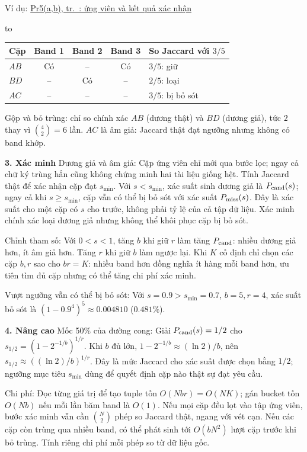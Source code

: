 \documentclass[10pt,a4paper,twocolumn]{article}
\newcommand{\key}[1]{#1:\enspace}
\newcommand{\blocklabel}[1]{\par\noindent#1\par\nobreak}
\newcommand{\qlink}[2]{\hyperref[question:#1]{#2}}
\newenvironment{example}[2]{%
  \par\addvspace{6pt}\noindent
  \raggedright
  \blocklabel{Ví dụ: \qlink{#1}{#2}}%
}{\par\addvspace{4pt}}
\newenvironment{examtable}[1]{%
  \par\addvspace{2pt}\noindent\hbox to \linewidth\bgroup\hfil
  \setlength{\tabcolsep}{4pt}%
  \renewcommand{\arraystretch}{1.12}\begin{tabular}{#1}%
}{\end{tabular}\hfil\egroup\par\addvspace{2pt}}
\newcommand{\unitheading}[2]{%
  \par\addvspace{1pt}\noindent\textbf{#1. #2}\enspace}
\newcommand{\unitverification}{\unitheading{3}{Xác minh}}
\newcommand{\unitadvanced}{\unitheading{4}{Nâng cao}}
\begin{document}
\begin{example}{Pr5}{Pr5(a,b), tr.~\pageref*{question:Pr5}: ứng viên và kết quả xác nhận}
\begin{examtable}{@{}l c c c l@{}}
\toprule
Cặp & Band 1 & Band 2 & Band 3 & So Jaccard với $3/5$ \\
\midrule
$AB$ & Có & -- & Có & $3/5$: giữ \\
$BD$ & -- & Có & -- & $2/5$: loại \\
$AC$ & -- & -- & -- & $3/5$: bị bỏ sót \\
\bottomrule
\end{examtable}
Gộp và bỏ trùng: chỉ so chính xác $AB$ (dương thật) và $BD$ (dương giả), tức $2$ thay vì $\binom{4}{2}=6$ lần. $AC$ là âm giả: Jaccard thật đạt ngưỡng nhưng không có band khớp.
\end{example}

\unitverification
\key{Dương giả và âm giả} Cặp ứng viên chỉ mới qua bước lọc; ngay cả chữ ký trùng hẳn cũng không chứng minh hai tài liệu giống hệt. Tính Jaccard thật để xác nhận cặp đạt $s_{\min}$. Với $s<s_{\min}$, xác suất sinh dương giả là $P_{\rm cand}(s)$; ngay cả khi $s\ge s_{\min}$, cặp vẫn có thể bị bỏ sót với xác suất $P_{\rm miss}(s)$. Đây là xác suất cho một cặp có $s$ cho trước, không phải tỷ lệ của cả tập dữ liệu. Xác minh chính xác loại dương giả nhưng không thể khôi phục cặp bị bỏ sót.

\key{Chỉnh tham số} Với $0<s<1$, tăng $b$ khi giữ $r$ làm tăng $P_{\rm cand}$: nhiều dương giả hơn, ít âm giả hơn. Tăng $r$ khi giữ $b$ làm ngược lại. Khi $K$ cố định chỉ chọn các cặp $b,r$ sao cho $br=K$: nhiều band hơn đồng nghĩa ít hàng mỗi band hơn, ưu tiên tìm đủ cặp nhưng có thể tăng chi phí xác minh.

\key{Vượt ngưỡng vẫn có thể bị bỏ sót} Với $s=0.9>s_{\min}=0.7$, $b=5,r=4$, xác suất bỏ sót là $(1-0.9^4)^5\approx0.004810$ ($0.481\%$).

\unitadvanced
\key{Mốc 50\% của đường cong} Giải $P_{\rm cand}(s)=1/2$ cho $s_{1/2}=(1-2^{-1/b})^{1/r}$. Khi $b$ đủ lớn, $1-2^{-1/b}\approx(\ln 2)/b$, nên $s_{1/2}\approx((\ln 2)/b)^{1/r}$. Đây là mức Jaccard cho xác suất được chọn bằng $1/2$; ngưỡng mục tiêu $s_{\min}$ dùng để quyết định cặp nào thật sự đạt yêu cầu.

\key{Chi phí} Đọc từng giá trị để tạo tuple tốn $O(Nbr)=O(NK)$; gán bucket tốn $O(Nb)$ nếu mỗi lần băm band là $O(1)$. Nếu mọi cặp đều lọt vào tập ứng viên, bước xác minh vẫn cần $\binom{N}{2}$ phép so Jaccard thật, ngang với vét cạn. Nếu các cặp còn trùng qua nhiều band, có thể phát sinh tới $O(bN^2)$ lượt cặp trước khi bỏ trùng. Tính riêng chi phí mỗi phép so từ dữ liệu gốc.
\end{document}

